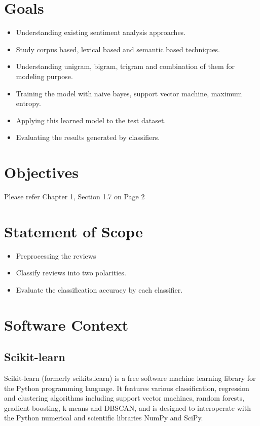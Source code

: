 \documentclass[oneside,a4paper,12pt]{pictreport}
\begin{document}
\section{Goals}
\begin{itemize}
\item Understanding existing sentiment analysis approaches.
\item Study corpus based, lexical based and semantic based techniques.
\item Understanding unigram, bigram, trigram and combination of them for modeling purpose.
\item Training the model with naive bayes, support vector machine, maximum entropy.
\item Applying this learned model to the test dataset.
\item Evaluating the results generated by classifiers.
\end{itemize}

\section{Objectives}

Please refer Chapter 1, Section 1.7 on Page 2

\section{Statement of Scope}
\begin{itemize}
\item Preprocessing the reviews
\item Classify reviews into two polarities.
\item Evaluate the classification accuracy by each classifier.
\end{itemize}

\section{Software Context}
\subsection{Scikit-learn} 
Scikit-learn (formerly scikits.learn) is a free software machine learning library for the Python programming language. It features various classification, regression and clustering algorithms including support vector machines, random forests, gradient boosting, k-means and DBSCAN, and is designed to interoperate with the Python numerical and scientific libraries NumPy and SciPy.
\end{document}
